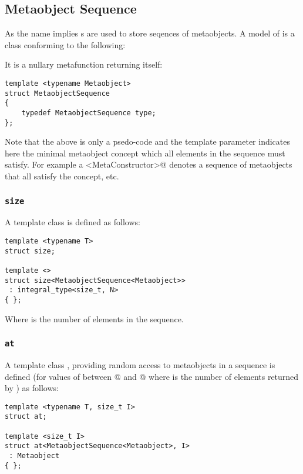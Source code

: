 \subsection{Metaobject Sequence}
\label{concept-MetaobjectSequence}

As the name implies s are used to store seqences
of metaobjects.
A model of  is a class conforming to the following:

It is a nullary metafunction returning itself:

\begin{lstlisting}
template <typename Metaobject>
struct MetaobjectSequence
{
	typedef MetaobjectSequence type;
};
\end{lstlisting}

Note that the above is only a psedo-code and
the template parameter \verb@Metaobject@ indicates here the minimal
metaobject concept which all elements in the sequence must satisfy.
For example a \verb@MetaobjectSequence<MetaConstructor>@ denotes a sequence
of metaobjects that all satisfy the  concept, etc.

\subsubsection{\texttt{size}}

A template class \verb@size@ is defined as follows:

\begin{lstlisting}
template <typename T>
struct size;

template <>
struct size<MetaobjectSequence<Metaobject>>
 : integral_type<size_t, N>
{ };
\end{lstlisting}

Where \verb@N@ is the number of elements in the sequence.

\subsubsection{\texttt{at}}

A template class \verb@at@, providing random access to metaobjects in a sequence
is defined (for values of \verb@I@ between @ and @ where \verb@N@
is the number of elements returned by \verb@size@) as follows:

\begin{lstlisting}
template <typename T, size_t I>
struct at;

template <size_t I>
struct at<MetaobjectSequence<Metaobject>, I>
 : Metaobject
{ };
\end{lstlisting}

